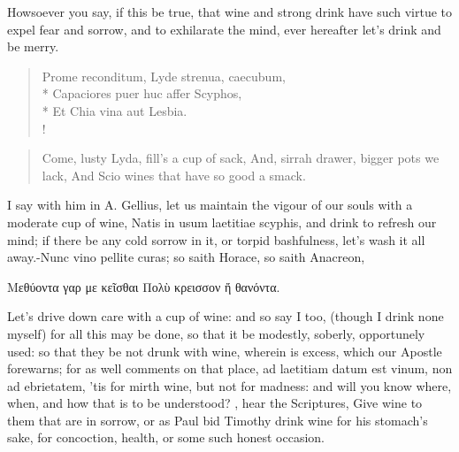 Howsoever you say, if this be true, that wine and strong drink have
such virtue to expel fear and sorrow, and to exhilarate the mind, ever
hereafter let's drink and be merry.
%
\begin{latin}
\begin{verse}%
Prome reconditum, Lyde strenua, caecubum,\\*
Capaciores puer huc affer Scyphos,\\*
Et Chia vina aut Lesbia.\\!
\end{verse}%
\end{latin}
\translationrule%
\begin{verse}%
Come, lusty Lyda, fill's a cup of sack,
And, sirrah drawer, bigger pots we lack,
And Scio wines that have so good a smack.
\end{verse}%
%

I say with him in A. Gellius, let us maintain the vigour of our
souls with a moderate cup of wine, Natis in usum laetitiae
scyphis, and drink to refresh our mind; if there be any cold sorrow in
it, or torpid bashfulness, let's wash it all away.-Nunc vino pellite
curas; so saith Horace, so saith Anacreon,

\textgreek[variant=ancient]{Μεθύοντα γαρ με κεῖσθαι
Πολὺ κρεισσον ἤ θανόντα.}

Let's drive down care with a cup of wine: and so say I too, (though I
drink none myself) for all this may be done, so that it be modestly,
soberly, opportunely used: so that they be not drunk with wine, wherein
is excess, which our Apostle forewarns; for as \Chrysostom{} well
comments on that place, ad laetitiam datum est vinum, non ad
ebrietatem, 'tis for mirth wine, but not for madness: and will you know
where, when, and how that is to be understood? , hear the Scriptures, Give wine to
them that are in sorrow, or as Paul bid Timothy drink wine for his
stomach's sake, for concoction, health, or some such honest occasion.

